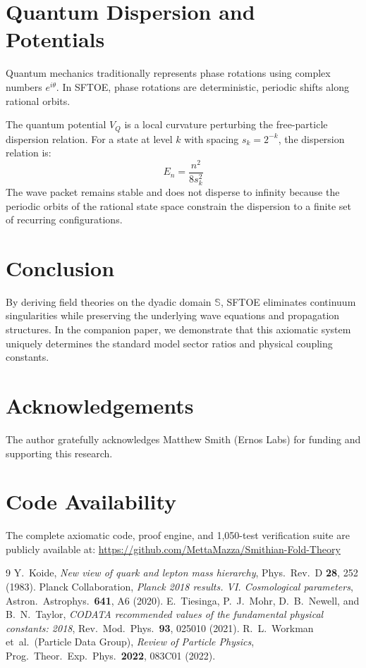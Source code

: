 \documentclass[11pt,a4paper]{article}
\begin{document}
\section{Quantum Dispersion and Potentials}
Quantum mechanics traditionally represents phase rotations using complex numbers $e^{i\theta}$. In SFTOE, phase rotations are deterministic, periodic shifts along rational orbits.

The quantum potential $V_Q$ is a local curvature perturbing the free-particle dispersion relation. For a state at level $k$ with spacing $s_k = 2^{-k}$, the dispersion relation is:
\begin{equation}
E_n = \frac{n^2}{8 s_k^2}
\end{equation}
The wave packet remains stable and does not disperse to infinity because the periodic orbits of the rational state space constrain the dispersion to a finite set of recurring configurations.

\section{Conclusion}
By deriving field theories on the dyadic domain $\mathbb{S}$, SFTOE eliminates continuum singularities while preserving the underlying wave equations and propagation structures. In the companion paper, we demonstrate that this axiomatic system uniquely determines the standard model sector ratios and physical coupling constants.

\section*{Acknowledgements}
The author gratefully acknowledges Matthew Smith (Ernos Labs) for funding and supporting this research.

\section*{Code Availability}
The complete axiomatic code, proof engine, and 1,050-test verification suite are publicly available at:
\url{https://github.com/MettaMazza/Smithian-Fold-Theory}

\begin{thebibliography}{9}
 Y.~Koide, \textit{New view of quark and lepton mass hierarchy}, Phys.\ Rev.\ D \textbf{28}, 252 (1983).
 Planck Collaboration, \textit{Planck 2018 results. VI. Cosmological parameters}, Astron.\ Astrophys.\ \textbf{641}, A6 (2020).
 E.~Tiesinga, P.~J.~Mohr, D.~B.~Newell, and B.~N.~Taylor, \textit{CODATA recommended values of the fundamental physical constants: 2018}, Rev.\ Mod.\ Phys.\ \textbf{93}, 025010 (2021).
 R.~L.~Workman et~al.\ (Particle Data Group), \textit{Review of Particle Physics}, Prog.\ Theor.\ Exp.\ Phys.\ \textbf{2022}, 083C01 (2022).
\end{thebibliography}
\end{document}
